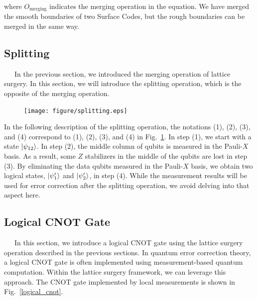 \documentclass[a4paper,11pt]{ltjsarticle}
\begin{document}
{    where $O_{\text{merging}}$ indicates the merging operation in the equation. We have merged the smooth boundaries of two Surface Codes, but the rough boundaries can be merged in the same way.

    \subsection{Splitting}{
        \ \ \ In the previous section, we introduced the merging operation of lattice surgery. In this section, we will introduce the splitting operation, which is the opposite of the merging operation.

        \begin{figure}[h]
            \centering
            \texttt{[image: figure/splitting.eps]}
            \vspace{0pt}\caption{}
            \label{splitting}
            \vspace{-10pt}
        \end{figure}

        In the following description of the splitting operation, the notations (1), (2), (3), and (4) correspond to (1), (2), (3), and (4) in Fig.~\ref{splitting}. In step (1), we start with a state $\ket{\psi_{12}}$. In step (2), the middle column of qubits is measured in the Pauli-$X$ basis. As a result, some $Z$ stabilizers in the middle of the qubits are lost in step (3). By eliminating the data qubits measured in the Pauli-$X$ basis, we obtain two logical states, $\ket{\psi'_1}$ and $\ket{\psi'_2}$, in step (4). While the measurement results will be used for error correction after the splitting operation, we avoid delving into that aspect here.
    }

    \subsection{Logical CNOT Gate}{
        \ \ \ In this section, we introduce a logical CNOT gate using the lattice surgery operation described in the previous sections. In quantum error correction theory, a logical CNOT gate is often implemented using measurement-based quantum computation. Within the lattice surgery framework, we can leverage this approach. The CNOT gate implemented by local measurements is shown in Fig.~\ref{logical_cnot}.
        \clearpage

}}
\end{document}
